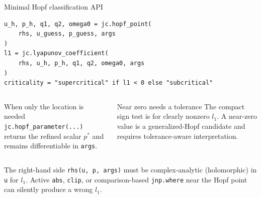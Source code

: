\begin{frame}[fragile]{Minimal Hopf classification API}
\begin{lstlisting}[basicstyle=\ttfamily\scriptsize]
u_h, p_h, q1, q2, omega0 = jc.hopf_point(
    rhs, u_guess, p_guess, args
)
l1 = jc.lyapunov_coefficient(
    rhs, u_h, p_h, q1, q2, omega0, args
)
criticality = "supercritical" if l1 < 0 else "subcritical"
\end{lstlisting}
\begin{columns}[T]
\begin{block}{When only the location is needed}
\texttt{jc.hopf\_parameter(...)} returns the refined scalar $p^*$ and remains
differentiable in \texttt{args}.
\end{block}
\begin{alertblock}{Near zero needs a tolerance}
The compact sign test is for clearly nonzero $l_1$. A near-zero value is a
generalized-Hopf candidate and requires tolerance-aware interpretation.
\end{alertblock}
\end{columns}
\vspace{1mm}
{\scriptsize The right-hand side \texttt{rhs(u, p, args)} must be
complex-analytic (holomorphic) in \texttt{u} for $l_1$. Active
\texttt{abs}, \texttt{clip}, or comparison-based \texttt{jnp.where} near the
Hopf point can silently produce a wrong $l_1$.}
\end{frame}

